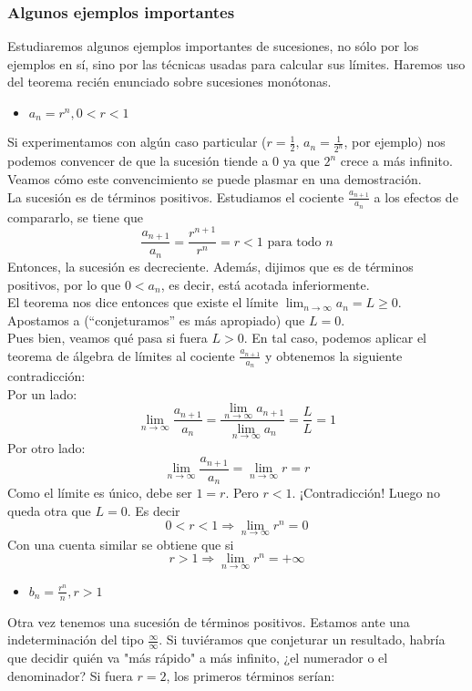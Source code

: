 \documentclass[../Teoría.root.tex]{subfiles}
\begin{document}
\subsubsection{Algunos ejemplos importantes}
Estudiaremos algunos ejemplos importantes de sucesiones, no sólo por los ejemplos en sí, sino por las técnicas usadas para calcular sus límites.
Haremos uso del teorema recién enunciado sobre sucesiones monótonas.
\begin{itemize}
    \item \(a_n=r^n, 0<r<1\)
\end{itemize}
Si experimentamos con algún caso particular (\(r=\frac{1}{2},\,a_n=\frac{1}{2^n}\), por ejemplo) nos podemos convencer de que la sucesión tiende a 0 ya que \(2^n\) crece a más infinito.
Veamos cómo este convencimiento se puede plasmar en una demostración.\\
La sucesión es de términos positivos.
Estudiamos el cociente \(\frac{a_{n+1}}{a_n}\) a los efectos de compararlo, se tiene que
\[\frac{a_{n+1}}{a_n}=\frac{r^{n+1}}{r^n}=r<1\text{ para todo }n\]
Entonces, la sucesión es decreciente.
Además, dijimos que es de términos positivos, por lo que \(0<a_n\), es decir, está acotada inferiormente.\\
El teorema nos dice entonces que existe el límite \(\lim_{n\to\infty}a_n=L\geq0\).
Apostamos a (“conjeturamos” es más apropiado) que \(L=0\).\\
Pues bien, veamos qué pasa si fuera \(L>0\).
En tal caso, podemos aplicar el teorema de álgebra de límites al cociente \(\frac{a_{n+1}}{a_n}\) y obtenemos la siguiente contradicción:\\
Por un lado:
\[\lim_{n\to\infty}\frac{a_{n+1}}{a_n}=\frac{\lim_{n\to\infty}a_{n+1}}{\lim_{n\to\infty}a_n}=\frac{L}{L}=1\]
Por otro lado:
\[\lim_{n\to\infty}\frac{a_{n+1}}{a_n}=\lim_{n\to\infty}r=r\]
Como el límite es único, debe ser \(1=r\).
Pero \(r<1\).
¡Contradicción!
Luego no queda otra que \(L=0\).
Es decir
\[0<r<1\Rightarrow\lim_{n\to\infty}r^n=0\]
Con una cuenta similar se obtiene que si
\[r>1\Rightarrow\lim_{n\to\infty}r^n=+\infty\]
\begin{itemize}
    \item \(b_n=\frac{r^n}{n}, r>1\)
\end{itemize}
Otra vez tenemos una sucesión de términos positivos.
Estamos ante una indeterminación del tipo \(\frac{\infty}{\infty}\).
Si tuviéramos que conjeturar un resultado, habría que decidir quién va "más rápido" a más infinito, ¿el numerador o el denominador?
Si fuera \(r=2\), los primeros términos serían:
\end{document}
